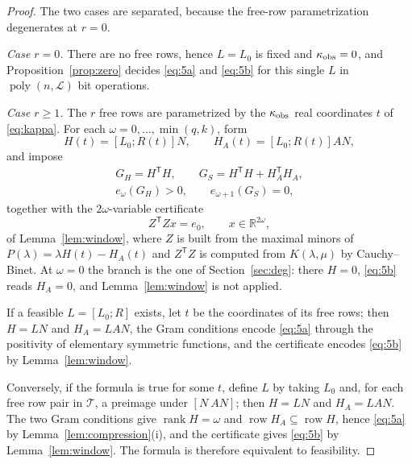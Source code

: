 \begin{proof}
The two cases are separated, because the free-row parametrization degenerates
at $r=0$.

\emph{Case $r=0$.} There are no free rows, hence $L=L_0$ is fixed and
$\kappa_{\rm obs}=0$, and Proposition~\ref{prop:zero} decides \eqref{eq:5a} and
\eqref{eq:5b} for this single $L$ in $\operatorname{poly}(n,\mathcal L)$ bit
operations.

\emph{Case $r\ge1$.} The $r$ free rows are parametrized by the
$\kappa_{\rm obs}$ real coordinates $t$ of \eqref{eq:kappa}. For each
$\omega=0,\dots,\min(q,k)$, form
\begin{equation*}
H(t)=[L_0;R(t)]N,\qquad H_A(t)=[L_0;R(t)]AN,
\end{equation*}
and impose
\begin{equation*}
\begin{gathered}
G_H=H^{\mathsf T}H,\qquad G_S=H^{\mathsf T}H+H_A^{\mathsf T}H_A,\\
e_\omega(G_H)>0,\qquad e_{\omega+1}(G_S)=0,
\end{gathered}
\end{equation*}
together with the $2\omega$-variable certificate
\begin{equation*}
Z^{\mathsf T}Zx=e_0,\qquad x\in\mathbb R^{2\omega},
\end{equation*}
of Lemma~\ref{lem:window}, where $Z$ is built from the maximal minors of
$P(\lambda)=\lambda H(t)-H_A(t)$ and $Z^{\mathsf T}Z$ is computed from
$K(\lambda,\mu)$ by Cauchy--Binet. At $\omega=0$ the branch is the one of
Section~\ref{sec:deg}: there $H=0$, \eqref{eq:5b} reads $H_A=0$, and
Lemma~\ref{lem:window} is not applied.

If a feasible $L=[L_0;R]$ exists, let $t$ be the coordinates of its free rows;
then $H=LN$ and $H_A=LAN$, the Gram conditions encode \eqref{eq:5a} through the
positivity of elementary symmetric functions, and the certificate encodes
\eqref{eq:5b} by Lemma~\ref{lem:window}.

Conversely, if the formula is true for some $t$, define $L$ by taking $L_0$ and,
for each free row pair in $\mathcal T$, a preimage under $[N\ AN]$; then $H=LN$
and $H_A=LAN$. The two Gram conditions give $\operatorname{rank}H=\omega$ and
$\operatorname{row}H_A\subseteq\operatorname{row}H$, hence \eqref{eq:5a} by
Lemma~\ref{lem:compression}(i), and the certificate gives \eqref{eq:5b} by
Lemma~\ref{lem:window}. The formula is therefore equivalent to feasibility.


\end{proof}
